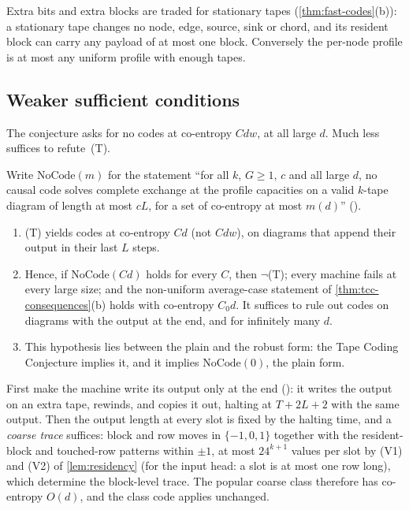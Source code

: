 \begin{outline}
Extra bits and extra blocks are traded for stationary tapes (\cref{thm:fast-codes}(b)): a stationary
tape changes no node, edge, source, sink or chord, and its resident block can carry any payload of at
most one block. Conversely the per-node profile is at most any uniform profile with enough tapes.
\end{outline}

\subsection{Weaker sufficient conditions}

The conjecture asks for no codes at co-entropy $Cdw$, at all large $d$. Much less suffices to
refute~(T).

\begin{theorem}\label{thm:coent-linear}
Write $\mathrm{NoCode}(m)$ for the statement ``for all $k$, $G\ge1$, $c$ and all large $d$, no causal
code solves complete exchange at the profile capacities on a valid $k$-tape diagram of length at most
$cL$, for a set of co-entropy at most $m(d)$'' ().
\begin{enumerate}[label=(\alph*)]
\item (T) yields codes at co-entropy $Cd$ (not $Cdw$), on diagrams that append their output in their
last $L$ steps.
\item Hence, if $\mathrm{NoCode}(Cd)$ holds for every $C$, then $\neg$(T); every machine fails at every
large size; and the non-uniform average-case statement of \cref{thm:tcc-consequences}(b) holds with
co-entropy $C_0d$. It suffices to rule out codes on diagrams with the output at the end, and for
infinitely many $d$.
\item This hypothesis lies between the plain and the robust form: the Tape Coding Conjecture implies
it, and it implies $\mathrm{NoCode}(0)$, the plain form.
\end{enumerate}
\end{theorem}

\begin{outline}
First make the machine write its output only at the end (): it writes the output on an
extra tape, rewinds, and copies it out, halting at $T+2L+2$ with the same output. Then the output length
at every slot is fixed by the halting time, and a \emph{coarse trace} suffices: block and row moves in
$\{-1,0,1\}$ together with the resident-block and touched-row patterns within $\pm1$, at most
$24^{k+1}$ values per slot by (V1) and (V2) of \cref{lem:residency} (for the input head: a slot is at most
one row long), which determine the block-level trace. The popular coarse
class therefore has co-entropy $O(d)$, and the class code applies unchanged.
\end{outline}

